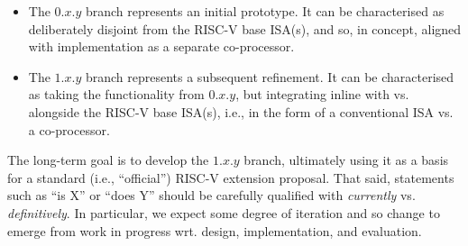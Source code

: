 \begin{itemize}
\item The $0.x.y$ branch
      represents an initial prototype.
      It can be characterised as deliberately disjoint from the RISC-V 
      base ISA(s), and so, in concept, aligned with implementation as a 
      separate co-processor.
\item The $1.x.y$ branch
      represents a subsequent refinement.
      It can be characterised as taking the functionality from $0.x.y$, 
      but integrating inline with vs. alongside the RISC-V base ISA(s), 
      i.e., in the form of a conventional ISA vs. a co-processor.
\end{itemize}

\noindent
The long-term goal is to develop the $1.x.y$ branch, ultimately using it
as a basis for a standard (i.e., ``official'') RISC-V extension proposal.
That said, statements such as 
``\XCRYPTO is   X'' 
or
``\XCRYPTO does Y''
should be carefully qualified with {\em currently} vs. {\em definitively}.  
In particular, we expect some degree of iteration and so change to emerge 
from work in progress wrt. design, implementation, and evaluation.


